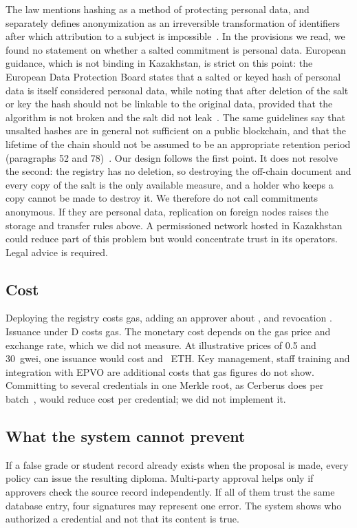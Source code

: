 The law mentions hashing as a method of protecting personal data, and separately defines anonymization as an irreversible transformation of identifiers after which attribution to a subject is impossible~\cite{kzdata}. In the provisions we read, we found no statement on whether a salted commitment is personal data. European guidance, which is not binding in Kazakhstan, is strict on this point: the European Data Protection Board states that a salted or keyed hash of personal data is itself considered personal data, while noting that after deletion of the salt or key the hash should not be linkable to the original data, provided that the algorithm is not broken and the salt did not leak~\cite{edpb2025}. The same guidelines say that unsalted hashes are in general not sufficient on a public blockchain, and that the lifetime of the chain should not be assumed to be an appropriate retention period (paragraphs 52 and 78)~\cite{edpb2025}. Our design follows the first point. It does not resolve the second: the registry has no deletion, so destroying the off-chain document and every copy of the salt is the only available measure, and a holder who keeps a copy cannot be made to destroy it. We therefore do not call commitments anonymous. If they are personal data, replication on foreign nodes raises the storage and transfer rules above. A permissioned network hosted in Kazakhstan could reduce part of this problem but would concentrate trust in its operators. Legal advice is required.

\subsection{Cost}
Deploying the registry costs \GasDeployRegistry{} gas, adding an approver about \GasAddApprover{}, and revocation \GasRevoke{}. Issuance under D costs \GasTotalD{} gas. The monetary cost depends on the gas price and exchange rate, which we did not measure. At illustrative prices of 0.5 and 30~gwei, one issuance would cost \EthLowD{} and \EthHighD{}~ETH. Key management, staff training and integration with EPVO are additional costs that gas figures do not show. Committing to several credentials in one Merkle root, as Cerberus does per batch~\cite{tariq2023}, would reduce cost per credential; we did not implement it.

\subsection{What the system cannot prevent}
If a false grade or student record already exists when the proposal is made, every policy can issue the resulting diploma. Multi-party approval helps only if approvers check the source record independently. If all of them trust the same database entry, four signatures may represent one error. The system shows who authorized a credential and not that its content is true.
